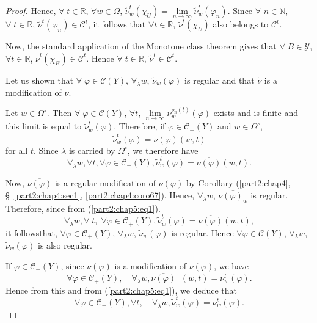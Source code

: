 \begin{proof}
Hence, $\forall \; t \in \mathbb{R}$, $\forall w \in \Omega$,
$\tilde{\nu}^t_w(\chi_U) = \lim\limits_{n \to \infty} \tilde{\nu}^t_w
(\varphi_n)$. Since $\forall$ $n \in \mathbb{N}$, $\forall \; t \in
\mathbb{R}$, $\tilde{\nu}^t(\varphi_n) \in \mathscr{C}^t$, it follows
that $\forall t\in \mathbb{R}$, $\tilde{\nu}^t(\chi_U)$ also belongs
to $\mathscr{C}^t$. 

Now, the standard application of the Monotone class theorem gives that
$\forall \; B \in \mathscr{Y}$, $\forall t \in \mathbb{R}$,
$\tilde{\nu}^t(\chi_B) \in \mathscr{C}^t$. Hence $\forall \; t \in
\mathbb{R}$, $\tilde{\nu}^t \in \mathscr{C}^t$. 

\medskip
{} Let us shown that $\forall \; \varphi
\in \mathscr{C}(Y)$, $\forall_\lambda w$, $\tilde{\nu}_w(\varphi)$ is
regular and that $\tilde{\nu}$ is a modification of $\nu$. 

Let $w \in \Omega^\circ$. Then $\forall \; \varphi \in \mathscr{C}
(Y)$, $\forall t$, $\lim\limits_{n \to \infty}
\nu^{\nu_n(t)}_w(\varphi)$ exists and is finite and this limit is
equal to $\tilde{\nu}^t_w(\varphi)$. Therefore, if $\varphi \in
\mathscr{C}_+(Y)$ and $w \in \Omega^\circ$, 
$$
\tilde{\nu}^t_w (\varphi) = \overline{\nu(\varphi)} (w,t)
$$
for all $t$. Since $\lambda$ is carried by $\Omega^\circ$, we
therefore have
\begin{equation*}
\forall_\lambda w, \forall t, \forall \varphi \in \mathscr{C}_+ (Y),
\tilde{\nu}^t_w(\varphi)  = \overline{\nu(\varphi)}
(w,t). \tag{1}\label{part2:chap5:eq1} 
\end{equation*}

Now, $\overline{\nu(\varphi)}$ is a regular modification of
$\nu(\varphi)$ by Corollary (\ref{part2:chap4},
\S\ \ref{part2:chap4:sec1}, \ref{part2:chap4:coro67}). Hence,
$\forall_\lambda 
w$, $\overline{\nu(\varphi)_w}$ is regular. Therefore, since from
(\ref{part2:chap5:eq1}). 
$$
\forall_\lambda w, \forall \; t, \; \forall \varphi \in \mathscr{C}_+
(Y), \tilde{\nu}^t_w(\varphi) = \overline{\nu(\varphi)} (w,t),
$$
it follows\pageoriginale that, $\forall \varphi \in \mathscr{C}_+(Y)$,
$\forall_\lambda w$, $\tilde{\nu}_w(\varphi)$ is regular. Hence
$\forall \varphi \in \mathscr{C}(Y)$, $\forall_\lambda w$,
$\tilde{\nu}_w(\varphi)$ is also regular.

If $\varphi \in \mathscr{C}_+ (Y)$,  since $\overline{\nu(\varphi)}$
is a modification of $\nu(\varphi)$, we have
$$ 
\forall \varphi \in \mathscr{C}_+(Y), \quad \forall_\lambda w,
\overline{\nu(\varphi)} \; \; (w,t)   = \nu^t_w(\varphi). 
$$
Hence from this and from (\ref{part2:chap5:eq1}), we deduce that 
$$
\forall \varphi \in \mathscr{C}_+ (Y), \forall t, \quad
\forall_\lambda w, \tilde{\nu}^t_w (\varphi) = \nu^t_w(\varphi). 
$$


\end{proof}
